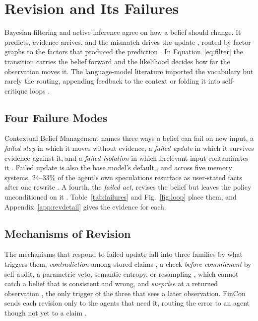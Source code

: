 \section{Revision and Its Failures}
\label{sec:revision}

Bayesian filtering and active inference agree on how a belief should change. It predicts, evidence arrives, and the mismatch drives the update \citep{friston2010free,friston2017active}, routed by factor graphs to the factors that produced the prediction \citep{kschischang2001factor,loeliger2004introduction}. In Equation~\ref{eq:filter} the transition carries the belief forward and the likelihood decides how far the observation moves it. The language-model literature imported the vocabulary but rarely the routing, appending feedback to the context or folding it into self-critique loops \citep{huang2022inner,madaan2023self,kim2023language}.

\subsection{Four Failure Modes}
\label{sec:rev:modes}

\ifnature\else
Contextual Belief Management names three ways a belief can fail on new input, a \emph{failed stay} in which it moves without evidence, a \emph{failed update} in which it survives evidence against it, and a \emph{failed isolation} in which irrelevant input contaminates it \citep{xu2026should}. Failed update is also the base model's default \citep{sharma2023towards,geng2025accumulating,zhang2025large}, and across five memory systems, 24--33\% of the agent's own speculations resurface as user-stated facts after one rewrite \citep{verbovoy2026rank}. A fourth, the \emph{failed act}, revises the belief but leaves the policy unconditioned on it \citep{deb2026stocktake,gao2026auditing}. Table~\ref{tab:failures} and Fig.~\ref{fig:loop} place them, and Appendix~\ref{app:revdetail} gives the evidence for each.
\fi

\subsection{Mechanisms of Revision}
\label{sec:rev:mech}

\ifnature\else
The mechanisms that respond to failed update fall into three families by what triggers them, \emph{contradiction} among stored claims \citep{wang2026toki,hao2026memops,xu2026governed,qin2026mom}, a check \emph{before commitment} by self-audit, a parametric veto, semantic entropy, or resampling \citep{yuan2026verify,song2026agent,yan2026denoiseflow,wang2026t2po}, which cannot catch a belief that is consistent and wrong, and \emph{surprise} at a returned observation \citep{song2026d,zhang2026selfevolvingx}, the only trigger of the three that sees a later observation. FinCon sends each revision only to the agents that need it, routing the error to an agent though not yet to a claim \citep{yu2024fincon}.
\fi

